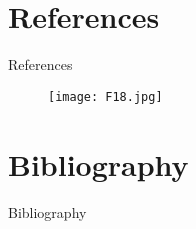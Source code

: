 \documentclass[pdflatex,compress,8pt,
	xcolor={dvipsnames,dvipsnames,svgnames,x11names,table},
	hyperref={colorlinks = true,
	breaklinks = true, 
	urlcolor = NavyBlue, 
	breaklinks = true}]{beamer}
\begin{document}
\section{References}
\begin{frame}{References}
\begin{figure}[H]
	\centering
		\texttt{[image: F18.jpg]}
\end{figure}
\end{frame}

\section{Bibliography}
\Large{Bibliography} \vspace{1em}
\nocite{*}
\printbibliography[heading=none]
\end{document}
